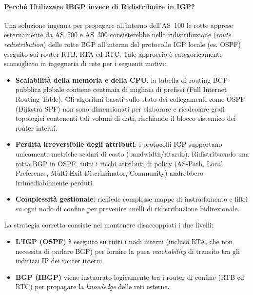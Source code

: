 \documentclass[11pt, a4paper]{article}
\begin{document}
\paragraph{Perché Utilizzare IBGP invece di Ridistribuire in IGP?}
Una soluzione ingenua per propagare all'interno dell'AS~100 le rotte apprese esternamente da AS~200 e AS~300 consisterebbe nella ridistribuzione (\emph{route redistribution}) delle rotte BGP all'interno del protocollo IGP locale (es. OSPF) eseguito sui router RTB, RTA ed RTC. Tale approccio è categoricamente sconsigliato in ingegneria di rete per i seguenti motivi:
\begin{itemize}[noitemsep]
    \item \textbf{Scalabilità della memoria e della CPU}: la tabella di routing BGP pubblica globale contiene centinaia di migliaia di prefissi (Full Internet Routing Table). Gli algoritmi basati sullo stato dei collegamenti come OSPF (Dijkstra SPF) non sono dimensionati per elaborare e ricalcolare grafi topologici contenenti tali volumi di dati, rischiando il blocco sistemico dei router interni.
    \item \textbf{Perdita irreversibile degli attributi}: i protocolli IGP supportano unicamente metriche scalari di costo (bandwidth/ritardo). Ridistribuendo una rotta BGP in OSPF, tutti i ricchi attributi di policy (AS-Path, Local Preference, Multi-Exit Discriminator, Community) andrebbero irrimediabilmente perduti.
    \item \textbf{Complessità gestionale}: richiede complesse mappe di instradamento e filtri su ogni nodo di confine per prevenire anelli di ridistribuzione bidirezionale.
\end{itemize}

La strategia corretta consiste nel mantenere disaccoppiati i due livelli:
\begin{itemize}[noitemsep]
    \item \textbf{L'IGP (OSPF)} è eseguito su tutti i nodi interni (incluso RTA, che non necessita di parlare BGP) per fornire la pura \emph{reachability} di transito tra gli indirizzi IP dei router interni.
    \item \textbf{BGP (IBGP)} viene instaurato logicamente tra i router di confine (RTB ed RTC) per propagare la \emph{knowledge} delle reti esterne.
\end{itemize}
\end{document}
